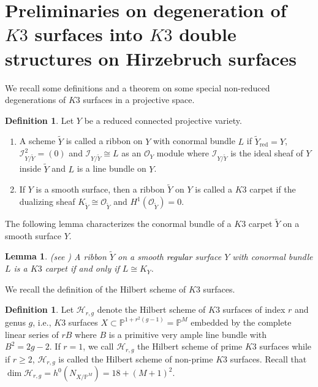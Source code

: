 \documentclass[11pt,twoside]{amsart}
\theoremstyle{plain}
\newtheorem{lemma}[theorem]{Lemma}
\theoremstyle{definition}
\newtheorem{definition}[theorem]{Definition}
\begin{document}
\section{Preliminaries on degeneration of $K3$ surfaces into $K3$ double structures on Hirzebruch surfaces}

We recall some definitions and a theorem on some special non-reduced degenerations of $K3$ surfaces in a projective space.

\begin{definition}\label{ribbon}
Let $Y$ be a reduced connected projective variety.
 \begin{enumerate}
     \item A scheme $\widetilde{Y}$ is called a ribbon on $Y$ with conormal bundle $L$ if $\widetilde{Y}_{\operatorname{red}} = Y$, $\mathcal{I}_{Y/\widetilde{Y}}^2 = (0)$ and $\mathcal{I}_{Y/\widetilde{Y}} \cong L$ as an $\mathcal{O}_Y$ module where $\mathcal{I}_{Y/\widetilde{Y}}$ is the ideal sheaf of $Y$ inside $\widetilde{Y}$ and $L$ is a line bundle on $Y$. 

     \item If $Y$ is a smooth surface, then a ribbon $\widetilde{Y}$ on $Y$ is called a $K3$ carpet if the dualizing sheaf $K_{\widetilde{Y}} \cong \mathcal{O}_{\widetilde{Y}}$ and $H^1(\mathcal{O}_{\widetilde{Y}})= 0$.

\end{enumerate}
\end{definition}  

The following lemma characterizes the conormal bundle of a $K3$ carpet $\widetilde{Y}$ on a smooth surface $Y$.

\begin{lemma}(see \cite[\textcolor{black}{Proposition $1.5$}]{GGP08})
    A ribbon $\widetilde{Y}$ on a smooth \textcolor{black}{regular} surface $Y$ with conormal bundle $L$ is a $K3$ carpet if and only if $L \cong K_Y$.
\end{lemma}

\color{black}
We recall the definition of the Hilbert scheme of $K3$ surfaces.

\begin{definition}\label{Hilbert schemes of K3 surfaces}
    Let $\mathcal{H}_{r,g}$ denote the Hilbert scheme of $K3$ surfaces of index $r$ and genus $g$, i.e., $K3$ surfaces $X \subset \mathbb{P}^{1+r^2(g-1)} = \mathbb{P}^M$ embedded by the complete linear series of $rB$ where $B$ is a primitive very ample line bundle with $B^2 = 2g-2$. If $r = 1$, we call $\mathcal{H}_{r,g}$ the Hilbert scheme of prime $K3$ surfaces while if $r \geq 2$, $\mathcal{H}_{r,g}$ is called the Hilbert scheme of non-prime $K3$ surfaces. Recall that $\operatorname{dim}\mathcal{H}_{r,g} = h^0(N_{X/\mathbb{P}^M}) =  18+(M+1)^2$.
\end{definition}
\color{black}
\end{document}
